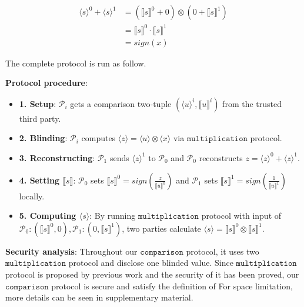 \documentclass[letterpaper]{article} %
\begin{document}
    \begin{align*}
        \langle s\rangle^{0} +\langle s\rangle^{1}&=(\llbracket s \rrbracket ^{0}+0)\otimes (0+\llbracket s \rrbracket ^{1})\\
        &=\llbracket s \rrbracket ^{0}\cdot \llbracket s \rrbracket ^{1}\\
        &=sign(x)
    \end{align*}




       The complete protocol is run as follow.

       \textbf{Protocol procedure}:
       \begin{itemize}
           \item \textbf{1. Setup}: $\mathcal{P}_{i}$ gets a comparison two-tuple $(\langle u\rangle ^{i},\llbracket u \rrbracket ^{i})$ from the trusted third party.

           \item \textbf{2. Blinding}:
           $\mathcal{P}_{i}$ computes $\langle z\rangle = \langle u\rangle \otimes \langle x\rangle $ via $\mathtt{multiplication}$ protocol.


           \item \textbf{3. Reconstructing}:
           $\mathcal{P}_{1}$ sends $\langle z\rangle ^{1}$ to $\mathcal{P}_{0}$ and
           $\mathcal{P}_{0}$ reconstructs
           $z = \langle z\rangle ^{0}+\langle z\rangle ^{1}$.



           \item \textbf{4. Setting $\llbracket s \rrbracket$}:
           $\mathcal{P}_{0}$ sets $\llbracket s \rrbracket^{0}
           =sign(\frac{z}{\llbracket u \rrbracket^{0}})$
           and $\mathcal{P}_{1}$ sets $\llbracket s \rrbracket^{1}
           =sign(\frac{1}{\llbracket u \rrbracket^{1}})$ locally.

           \item \textbf{5. Computing $\langle s\rangle$}:
           By running $\mathtt{multiplication}$ protocol with input of
           $\mathcal{P}_{0}:(\llbracket s \rrbracket ^{0},0),\mathcal{P}_{1}:(0,\llbracket s \rrbracket ^{1})$,
           two parties calculate  $\langle s\rangle = \llbracket s \rrbracket ^{0}\otimes \llbracket s \rrbracket ^{1}$.

       \end{itemize}
       \textbf{Security analysis}:
       Throughout our $\mathtt{comparison}$ protocol,
       it uses two $\mathtt{multiplication}$ protocol and disclose one blinded value.
       Since $\mathtt{multiplication}$ protocol is proposed by previous work
       and the security of it has been proved, our $\mathtt{comparison}$ protocol is secure
       and satisfy the definition of
       For space limitation, more details can be seen in supplementary material.
\end{document}

